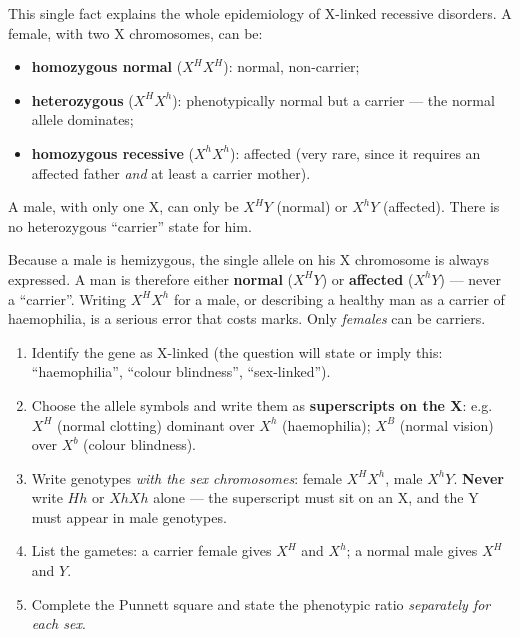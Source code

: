 \documentclass[11pt]{article}
\newcommand{\cle}[1]{{\popxbold\color{popdark}#1}}
\begin{document}
This single fact explains the whole epidemiology of X-linked recessive disorders. A female, with two X chromosomes, can be:
\begin{itemize}
\item \textbf{homozygous normal} ($X^H X^H$): normal, non-carrier;
\item \textbf{heterozygous} ($X^H X^h$): phenotypically normal but a \cle{carrier} --- the normal allele dominates;
\item \textbf{homozygous recessive} ($X^h X^h$): affected (very rare, since it requires an affected father \emph{and} at least a carrier mother).
\end{itemize}
A male, with only one X, can only be $X^H Y$ (normal) or $X^h Y$ (affected). There is no heterozygous ``carrier'' state for him.

\begin{attention}
Because a male is hemizygous, the single allele on his X chromosome is always expressed. A man is therefore either \textbf{normal} ($X^H Y$) or \textbf{affected} ($X^h Y$) --- never a ``carrier''. Writing $X^H X^h$ for a male, or describing a healthy man as a carrier of haemophilia, is a serious error that costs marks. Only \emph{females} can be carriers.
\end{attention}

\begin{methode}
\begin{enumerate}
\item Identify the gene as X-linked (the question will state or imply this: ``haemophilia'', ``colour blindness'', ``sex-linked'').
\item Choose the allele symbols and write them as \textbf{superscripts on the X}: e.g.\ $X^H$ (normal clotting) dominant over $X^h$ (haemophilia); $X^B$ (normal vision) over $X^b$ (colour blindness).
\item Write genotypes \emph{with the sex chromosomes}: female $X^H X^h$, male $X^h Y$. \textbf{Never} write $Hh$ or $XhXh$ alone --- the superscript must sit on an X, and the Y must appear in male genotypes.
\item List the gametes: a carrier female gives $X^H$ and $X^h$; a normal male gives $X^H$ and $Y$.
\item Complete the Punnett square and state the phenotypic ratio \emph{separately for each sex}.
\end{enumerate}
\end{methode}
\end{document}
